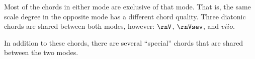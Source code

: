 
Most of the chords in either mode are exclusive of that
mode. That is, the same scale degree in the opposite mode
has a different chord quality. Three diatonic chords are
shared between both modes, however: $\rnV$, $\rnVsev$, and
$viio$.

In addition to these chords, there are several ``special''
chords that are shared between the two modes.

